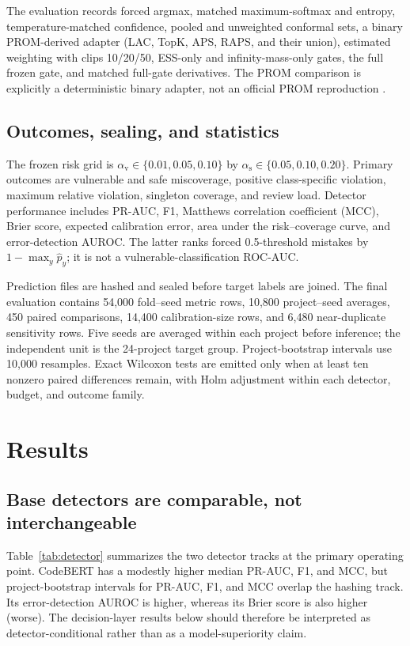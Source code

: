 \documentclass[research]{fcs}
\newcommand{\av}{\alpha_{\mathrm{v}}}
\newcommand{\as}{\alpha_{\mathrm{s}}}
\begin{document}
The evaluation records forced argmax, matched maximum-softmax and entropy, temperature-matched confidence, pooled and unweighted conformal sets, a binary PROM-derived adapter (LAC, TopK, APS, RAPS, and their union), estimated weighting with clips 10/20/50, ESS-only and infinity-mass-only gates, the full frozen gate, and matched full-gate derivatives. The PROM comparison is explicitly a deterministic binary adapter, not an official PROM reproduction \cite{wang2025prom}.

\subsection{Outcomes, sealing, and statistics}

The frozen risk grid is $\av\in\{0.01,0.05,0.10\}$ by $\as\in\{0.05,0.10,0.20\}$. Primary outcomes are vulnerable and safe miscoverage, positive class-specific violation, maximum relative violation, singleton coverage, and review load. Detector performance includes PR-AUC, F1, Matthews correlation coefficient (MCC), Brier score, expected calibration error, area under the risk--coverage curve, and error-detection AUROC. The latter ranks forced 0.5-threshold mistakes by $1-\max_y\widehat p_y$; it is not a vulnerable-classification ROC-AUC.

Prediction files are hashed and sealed before target labels are joined. The final evaluation contains 54,000 fold--seed metric rows, 10,800 project--seed averages, 450 paired comparisons, 14,400 calibration-size rows, and 6,480 near-duplicate sensitivity rows. Five seeds are averaged within each project before inference; the independent unit is the 24-project target group. Project-bootstrap intervals use 10,000 resamples. Exact Wilcoxon tests are emitted only when at least ten nonzero paired differences remain, with Holm adjustment within each detector, budget, and outcome family.

\section{Results}

\subsection{Base detectors are comparable, not interchangeable}

Table~\ref{tab:detector} summarizes the two detector tracks at the primary operating point. CodeBERT has a modestly higher median PR-AUC, F1, and MCC, but project-bootstrap intervals for PR-AUC, F1, and MCC overlap the hashing track. Its error-detection AUROC is higher, whereas its Brier score is also higher (worse). The decision-layer results below should therefore be interpreted as detector-conditional rather than as a model-superiority claim.
\end{document}
